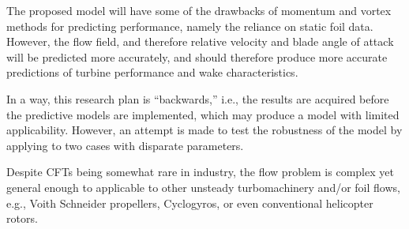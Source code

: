 The proposed model will have some of the drawbacks of momentum and vortex
methods for predicting performance, namely the reliance on static foil data.
However, the flow field, and therefore relative velocity and blade angle of
attack will be predicted more accurately, and should therefore produce more
accurate predictions of turbine performance and wake characteristics.

In a way, this research plan is ``backwards,'' i.e., the results are acquired
before the predictive models are implemented, which may produce a model with
limited applicability. However, an attempt is made to test the robustness of the
model by applying to two cases with disparate parameters.

Despite CFTs being somewhat rare in industry, the flow problem is complex yet
general enough to applicable to other unsteady turbomachinery and/or foil flows,
e.g., Voith Schneider propellers, Cyclogyros, or even conventional helicopter
rotors.


